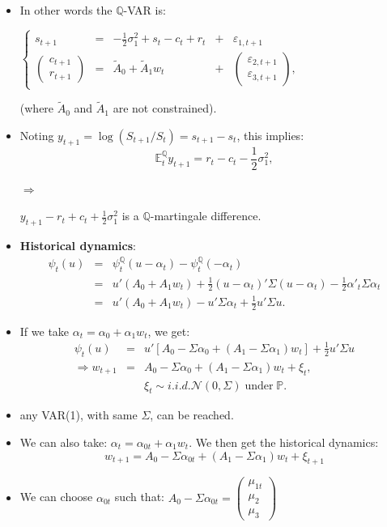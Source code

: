 \documentclass[
  12pt,
]{book}
\theoremstyle{definition}
\theoremstyle{definition}
\theoremstyle{definition}
\theoremstyle{definition}
\theoremstyle{remark}
\begin{document}
\begin{itemize}
\item
  In other words the \(\mathbb{Q}\)-VAR is:

  \centerline{$\left\{\begin{array}{cclcc} s_{t+1} & = & -\frac{1}{2}
  \sigma^2_1 + s_t - c_t + r_t &+& \varepsilon_{1,t+1} \\
  \left(\begin{array}{c} c_{t+1} \\ r_{t+1} \end{array} \right) & = &
  \tilde{A}_0 + \tilde{A}_1 w_t &+& \left(\begin{array}{c} \varepsilon_{2,t+1} \\
  \varepsilon_{3,t+1} \end{array} \right),
  \end{array} \right.$}

  (where \(\tilde{A}_0\) and \(\tilde{A}_1\) are not constrained).
\item
  Noting \(y_{t+1} = \log (S_{t+1}/S_t) = s_{t+1} - s_t\), this implies:
  \[
  \mathbb{E}^{\mathbb{Q}}_t y_{t+1} = r_t - c_t - \frac{1}{2} \sigma^2_1,
  \]

  \item[$\Rightarrow$]

  \(y_{t+1} - r_t + c_t + \frac{1}{2} \sigma^2_1\) is a \(\mathbb{Q}\)-martingale difference.
\item
  \textbf{Historical dynamics}:
  \[
  \begin{array}{lcl}
  \psi_t (u) & = & \psi^{\mathbb{Q}}_t (u-\alpha_t) - \psi^{\mathbb{Q}}_t (- \alpha_t) \\
  &=& u' (A_0 + A_1 w_t) + \frac{1}{2} (u-\alpha_t)' \Sigma (u-\alpha_t)- \frac{1}{2} \alpha'_t
  \Sigma \alpha_t \\
  &=&u' (A_0 + A_1 w_t) - u' \Sigma \alpha_t + \frac{1}{2} u' \Sigma u.
  \end{array}
  \]
\item
  If we take \(\alpha_t = \alpha_0 + \alpha_1 w_t\), we get:
  \begin{eqnarray*}
  \psi_t (u) &=& u' [A_0 - \Sigma \alpha_0 + (A_1 - \Sigma \alpha_1) w_t] + \frac{1}{2} u' \Sigma u \\
  \Rightarrow  w_{t+1} &=& A_0 - \Sigma \alpha_0 + (A_1 - \Sigma \alpha_1) w_t + \xi_t,\\
  && \xi_t \sim  i.i.d.   \mathcal{N}(0,\Sigma)\; \mbox{under}\;\mathbb{P}.
  \end{eqnarray*}
\item
  any VAR(1), with same \(\Sigma\), can be reached.
\item
  We can also take: \(\alpha_t = \alpha_{0t} + \alpha_1 w_t\). We then get the historical dynamics:
  \[
  w_{t+1} = A_{0} - \Sigma \alpha_{0t} + (A_1 - \Sigma \alpha_1) w_t + \xi_{t+1}
  \]
\item
  We can choose \(\alpha_{0t}\) such that: \(A_{0} - \Sigma \alpha_{0t} = \left( \begin{array}{c} \mu_{1t} \\ \mu_2 \\ \mu_3 \end{array}\right)\)
\end{itemize}
\end{document}
